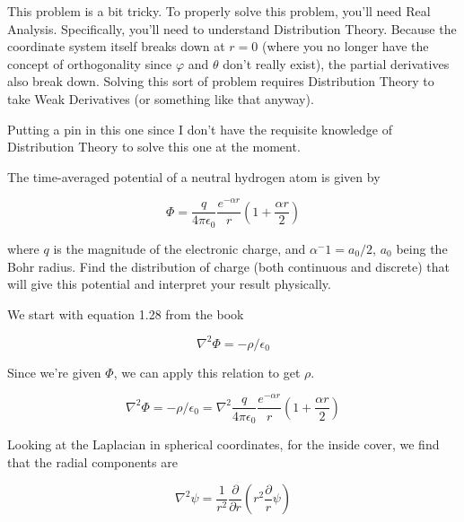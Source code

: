 \begin{question}

  This problem is a bit tricky.  To properly solve this problem,
  you'll need Real Analysis.  Specifically, you'll need to understand
  Distribution Theory.  Because the coordinate system itself breaks
  down at $r=0$ (where you no longer have the concept of orthogonality
  since $\varphi$ and $\theta$ don't really exist), the partial
  derivatives also break down.  Solving this sort of problem requires
  Distribution Theory to take Weak Derivatives (or something like that
  anyway).

  Putting a pin in this one since I don't have the requisite knowledge
  of Distribution Theory to solve this one at the moment.


  
The time-averaged potential of a neutral hydrogen atom is given by

\begin{equation}
  \Phi = \frac{q}{4\pi\epsilon_0} \frac{e^{-\alpha r}}{r} \left( 1 +
  \frac{\alpha r}{2} \right)
\end{equation}

where $q$ is the magnitude of the electronic charge, and $\alpha^-1 =
a_0/2$, $a_0$ being the Bohr radius. Find the distribution of charge
(both continuous and discrete) that will give this potential and
interpret your result physically.

\end{question}


We start with equation 1.28 from the book

\begin{equation}
  \nabla^2 \Phi = -\rho/\epsilon_0
\end{equation}

Since we're given $\Phi$, we can apply this relation to get $\rho$.

\begin{equation}
  \nabla^2 \Phi
  = -\rho/\epsilon_0
  = \nabla^2 \frac{q}{4\pi\epsilon_0} \frac{e^{-\alpha r}}{r} \left( 1 +
  \frac{\alpha r}{2} \right)
\end{equation}

Looking at the Laplacian in spherical coordinates, for the inside
cover, we find that the radial components are

\begin{equation}
  \nabla^2 \psi
  = \frac{1}{r^2}
  \frac{\partial}{\partial r}
  \left(r^2 \frac{\partial}{r}\psi \right)
\end{equation}

